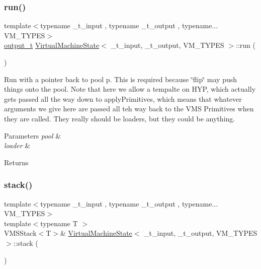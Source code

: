 \subsubsection{\texorpdfstring{run()}{run()}}
{\footnotesize\ttfamily template$<$typename \+\_\+t\+\_\+input , typename \+\_\+t\+\_\+output , typename... V\+M\+\_\+\+T\+Y\+P\+ES$>$ \\
\hyperlink{class_virtual_machine_state_a1015cee5061f82f82ef6a953b51f9bd5}{output\+\_\+t} \hyperlink{class_virtual_machine_state}{Virtual\+Machine\+State}$<$ \+\_\+t\+\_\+input, \+\_\+t\+\_\+output, V\+M\+\_\+\+T\+Y\+P\+ES $>$\+::run (\begin{DoxyParamCaption}{ }\end{DoxyParamCaption})\hspace{0.3cm}{\ttfamily [inline]}}



Run with a pointer back to pool p. This is required because \char`\"{}flip\char`\"{} may push things onto the pool. Note that here we allow a tempalte on H\+YP, which actually gets passed all the way down to apply\+Primitives, which means that whatever arguments we give here are passed all teh way back to the V\+MS Primitives when they are called. They really should be loaders, but they could be anything. 


\begin{DoxyParams}{Parameters}
{\em pool} & \\
\hline
{\em loader} & \\
\hline
\end{DoxyParams}
\begin{DoxyReturn}{Returns}

\end{DoxyReturn}
\mbox{\label{class_virtual_machine_state_a580428f53e64cde8aef3c0a6a79838ec}} 
\subsubsection{\texorpdfstring{stack()}{stack()}\hspace{0.1cm}{\footnotesize\ttfamily [1/2]}}
{\footnotesize\ttfamily template$<$typename \+\_\+t\+\_\+input , typename \+\_\+t\+\_\+output , typename... V\+M\+\_\+\+T\+Y\+P\+ES$>$ \\
template$<$typename T $>$ \\
V\+M\+S\+Stack$<$T$>$\& \hyperlink{class_virtual_machine_state}{Virtual\+Machine\+State}$<$ \+\_\+t\+\_\+input, \+\_\+t\+\_\+output, V\+M\+\_\+\+T\+Y\+P\+ES $>$\+::stack (\begin{DoxyParamCaption}{ }\end{DoxyParamCaption})\hspace{0.3cm}{\ttfamily [inline]}}



